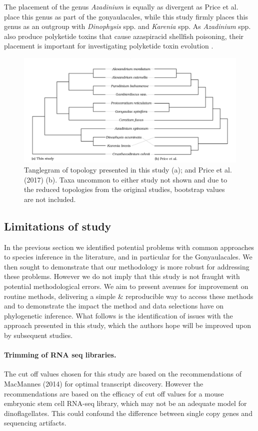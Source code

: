 \documentclass[12pt]{article}
\begin{document}
The placement of the genus \emph{Azadinium} is equally as divergent as Price et al. place this genus as part of the gonyaulacales, while this study firmly places this genus as an outgroup with \emph{Dinophysis} spp. and \emph{Karenia} spp.
As \emph{Azadinium} spp. also produce polyketide toxins that cause azaspiracid shellfish poisoning, their placement is important for investigating polyketide toxin evolution \cite{meyer2015transcriptomic}.
\FloatBarrier 
\begin{figure} 
\includegraphics[scale=.23]{figures/Price-comparison.png}
\caption{Tanglegram of topology presented in this study (a); and Price et al. (2017) (b). Taxa uncommon to either study not shown and due to the reduced topologies from the original studies, bootstrap values are not included.} 
\label{fig:tangle}
\end{figure} 
\FloatBarrier

\subsection*{Limitations of study}
In the previous section we identified potential problems with common approaches to species inference in the literature, and in particular for the Gonyaulacales. 
We then sought to demonstrate that our methodology is more robust for addressing these problems. 
However we do not imply that this study is not fraught with potential methodological errors. 
We aim to present avenues for improvement on routine methods, delivering a simple \& reproducible way to access these methods and to demonstrate the impact the method and data selections have on phylogenetic inference. 
What follows is the identification of issues with the approach presented in this study, which the authors hope will be improved upon by subsequent studies. 
\paragraph*{Trimming of RNA seq libraries.} The cut off values chosen for this study are based on the recommendations of MacMannes (2014) for optimal transcript discovery. 
However the recommendations are based on the efficacy of cut off values for a mouse embryonic stem cell RNA-seq library, which may not be an adequate model for dinoflagellates. 
This could confound the difference between single copy genes and sequencing artifacts.
\end{document}
